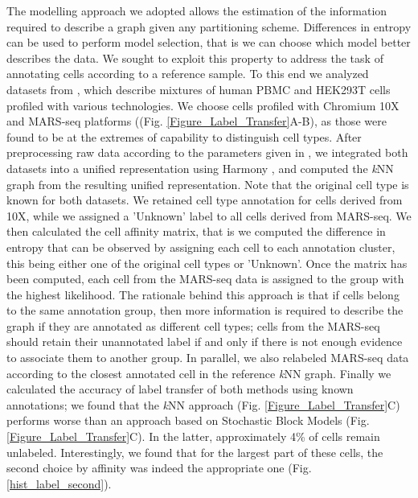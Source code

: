 \documentclass[10pt]{article}
\begin{document}
The modelling approach we adopted allows the estimation of the information required to describe a graph given any partitioning scheme. Differences in entropy can be used to perform model selection, that is we can choose which model better describes the data. We sought to exploit this property to address the task of annotating cells according to a reference sample. To this end we analyzed datasets from \cite{mereu_2020}, which describe mixtures of human PBMC and HEK293T cells profiled with various technologies. We choose cells profiled with Chromium 10X and MARS-seq platforms ((Fig. \ref{Figure_Label_Transfer}A-B), as those were found to be at the extremes of capability to distinguish cell types. After preprocessing raw data according to the parameters given in \cite{mereu_2020}, we integrated both datasets into a unified representation using Harmony \cite{Korsunsky_2019}, and computed the \emph{k}NN graph from the resulting unified representation. Note that the original cell type is known for both datasets. We retained cell type annotation for cells derived from 10X, while we assigned a 'Unknown' label to all cells derived from MARS-seq. We then calculated the cell affinity matrix, that is we computed the difference in entropy that can be observed by assigning each cell to each annotation cluster, this being either one of the original cell types or 'Unknown'. Once the matrix has been computed, each cell from the MARS-seq data is assigned to the group with the highest likelihood. The rationale behind this approach is that if cells belong to the same annotation group, then more information is required to describe the graph if they are annotated as different cell types; cells from the MARS-seq should retain their unannotated label if and only if there is not enough evidence to associate them to another group. In parallel, we also relabeled MARS-seq data according to the closest annotated cell in the reference \emph{k}NN graph. Finally we calculated the accuracy of label transfer of both methods using known annotations; we found that the \emph{k}NN approach (Fig. \ref{Figure_Label_Transfer}C) performs worse than an approach based on Stochastic Block Models (Fig. \ref{Figure_Label_Transfer}C). In the latter, approximately 4\% of cells remain unlabeled. Interestingly, we found that for the largest part of these cells, the second choice by affinity was indeed the appropriate one (Fig. \ref{hist_label_second}).
\end{document}
